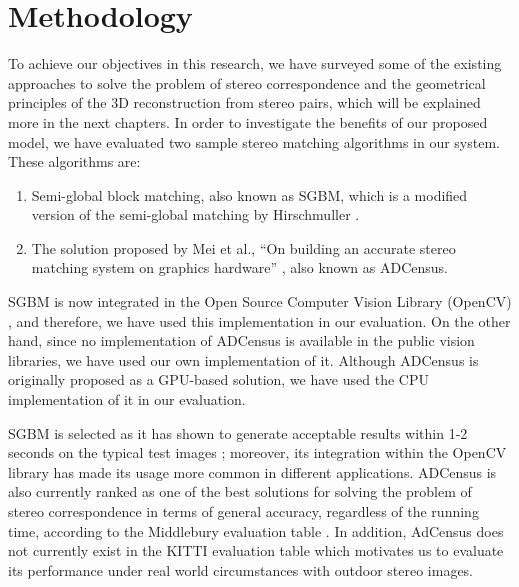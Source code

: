 
\section{Methodology}
To achieve our objectives in this research, we have surveyed some of the existing approaches to solve the problem 
of stereo correspondence and the geometrical principles of the 3D reconstruction from stereo pairs, which will be explained more 
in the next chapters. 
In order to investigate the benefits of our proposed model, we have evaluated two sample stereo matching algorithms in our system. 
These algorithms are:
\begin{enumerate}
\item Semi-global block matching, also known as SGBM, which is a modified version of the semi-global matching by Hirschmuller \cite{hir08}.
\item The solution  proposed by Mei et al., ``On building an accurate stereo matching system on graphics hardware'' \cite{mei11}, also known as ADCensus.
\end{enumerate}

SGBM is now integrated in the Open Source Computer Vision Library (OpenCV) \cite{sgbm}, and therefore, we have used this implementation
in our evaluation.
On the other hand, since no implementation of ADCensus is available in the public vision libraries, we have used our own implementation of it.
Although ADCensus is originally proposed as a GPU-based solution, we have used the CPU implementation of it in our evaluation.

SGBM is selected as it has shown to generate acceptable results within 1-2 seconds on the typical test images \cite{hir08}; moreover,
its integration within the OpenCV library has made its usage more common in different applications. 
ADCensus is also currently ranked as one of the best solutions 
for solving the problem of stereo correspondence in terms of general accuracy, regardless of the running time, 
according to the Middlebury evaluation table \cite{mideval}.
In addition, AdCensus does not currently exist in the KITTI evaluation table which motivates us to evaluate its performance
under real world circumstances with outdoor stereo images.

